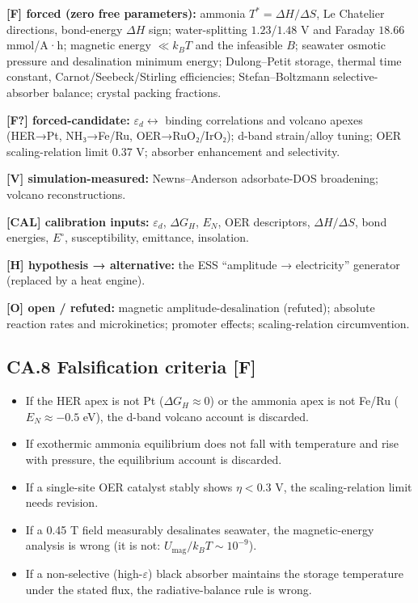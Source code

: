 \documentclass[
  10pt,
]{article}
\providecommand{\tightlist}{%
  \setlength{\itemsep}{0pt}\setlength{\parskip}{0pt}}
\begin{document}
\textbf{{[}F{]} forced (zero free parameters):} ammonia
\(T^{*}=\Delta H/\Delta S\), Le Chatelier directions, bond-energy
\(\Delta H\) sign; water-splitting \(1.23\)/\(1.48\) V and Faraday
\(18.66\) mmol/A·h; magnetic energy \(\ll k_BT\) and the infeasible
\(B\); seawater osmotic pressure and desalination minimum energy;
Dulong--Petit storage, thermal time constant, Carnot/Seebeck/Stirling
efficiencies; Stefan--Boltzmann selective-absorber balance; crystal
packing fractions.

\textbf{{[}F?{]} forced-candidate:} \(\varepsilon_d\leftrightarrow\)
binding correlations and volcano apexes (HER→Pt, NH₃→Fe/Ru,
OER→RuO₂/IrO₂); d-band strain/alloy tuning; OER scaling-relation limit
0.37 V; absorber enhancement and selectivity.

\textbf{{[}V{]} simulation-measured:} Newns--Anderson adsorbate-DOS
broadening; volcano reconstructions.

\textbf{{[}CAL{]} calibration inputs:} \(\varepsilon_d\),
\(\Delta G_H\), \(E_N\), OER descriptors, \(\Delta H/\Delta S\), bond
energies, \(E^\circ\), susceptibility, emittance, insolation.

\textbf{{[}H{]} hypothesis → alternative:} the ESS ``amplitude →
electricity'' generator (replaced by a heat engine).

\textbf{{[}O{]} open / refuted:} magnetic amplitude-desalination
(refuted); absolute reaction rates and microkinetics; promoter effects;
scaling-relation circumvention.

\hypertarget{ca.8-falsification-criteria-f}{%
\subsection{\texorpdfstring{CA.8 Falsification criteria
\textbf{{[}F{]}}}{CA.8 Falsification criteria {[}F{]}}}\label{ca.8-falsification-criteria-f}}

\begin{itemize}
\tightlist
\item
  If the HER apex is not Pt (\(\Delta G_H\approx0\)) or the ammonia apex
  is not Fe/Ru (\(E_N\approx-0.5\) eV), the d-band volcano account is
  discarded.
\item
  If exothermic ammonia equilibrium does not fall with temperature and
  rise with pressure, the equilibrium account is discarded.
\item
  If a single-site OER catalyst stably shows \(\eta<0.3\) V, the
  scaling-relation limit needs revision.
\item
  If a 0.45 T field measurably desalinates seawater, the magnetic-energy
  analysis is wrong (it is not: \(U_{\text{mag}}/k_BT\sim10^{-9}\)).
\item
  If a non-selective (high-\(\varepsilon\)) black absorber maintains the
  storage temperature under the stated flux, the radiative-balance rule
  is wrong.
\end{itemize}
\end{document}
